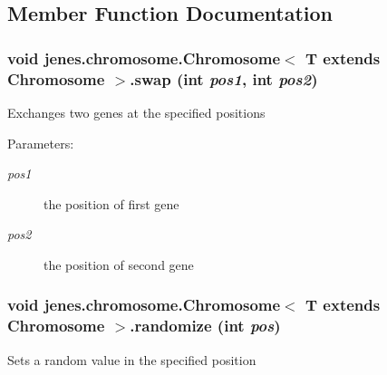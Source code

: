 \subsection{Member Function Documentation}
\hypertarget{interfacejenes_1_1chromosome_1_1_chromosome_3_01_t_01extends_01_chromosome_01_4_d3a9fc2dbf63e0fb2b486a08ace2a6e8}{
\subsubsection[swap]{\setlength{\rightskip}{0pt plus 5cm}void jenes.chromosome.Chromosome$<$ T extends Chromosome $>$.swap (int {\em pos1}, \/  int {\em pos2})}}
\label{interfacejenes_1_1chromosome_1_1_chromosome_3_01_t_01extends_01_chromosome_01_4_d3a9fc2dbf63e0fb2b486a08ace2a6e8}


Exchanges two genes at the specified positions 

\begin{Desc}
\item[Parameters:]
\begin{description}
\item[{\em pos1}]the position of first gene \item[{\em pos2}]the position of second gene \end{description}
\end{Desc}
\hypertarget{interfacejenes_1_1chromosome_1_1_chromosome_3_01_t_01extends_01_chromosome_01_4_1afc86af7df16d75b9fceaac91b57216}{
\subsubsection[randomize]{\setlength{\rightskip}{0pt plus 5cm}void jenes.chromosome.Chromosome$<$ T extends Chromosome $>$.randomize (int {\em pos})}}
\label{interfacejenes_1_1chromosome_1_1_chromosome_3_01_t_01extends_01_chromosome_01_4_1afc86af7df16d75b9fceaac91b57216}


Sets a random value in the specified position 

